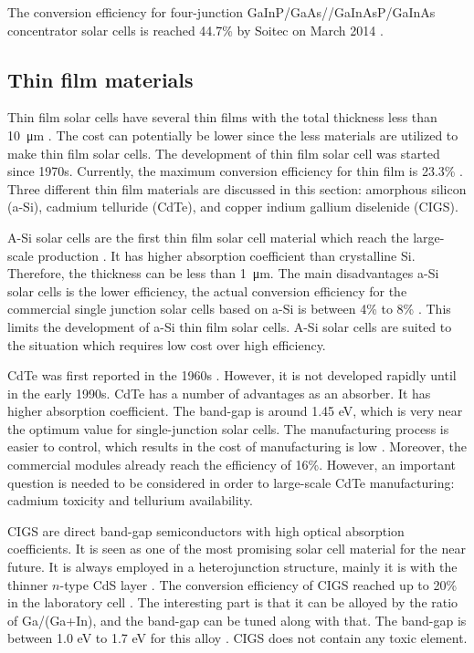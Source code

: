 \documentclass[a4paper, 12pt, titlepage,oneside,drop]{kthesis}
\begin{document}
The conversion efficiency for four-junction GaInP/GaAs//GaInAsP/GaInAs concentrator solar cells is reached 44.7\% by Soitec on March 2014 \cite{dimroth2014wafer}.

\subsection{Thin film materials}

Thin film solar cells have several thin films with the total thickness less than \SI{10} {\micro\meter} \cite{maissel1995handbook}. The cost can potentially be lower since the less materials are utilized to make thin film solar cells. The development of thin film
solar cell was started since 1970s. Currently, the maximum conversion efficiency for thin film is 23.3\% \cite{ward2014cu}. Three different thin film
materials are discussed in this section: amorphous silicon (a-Si), cadmium telluride (CdTe), and copper indium gallium diselenide (CIGS).

A-Si solar cells are the first thin film solar cell material which reach the large-scale production \cite{carlson1976amorphous, street2000technology, schropp1998amorphous}. It has higher absorption coefficient than crystalline Si. Therefore, the thickness can be less than \SI{1} {\micro\meter}. The 
main disadvantages a-Si solar cells is the lower efficiency, the actual conversion efficiency for the commercial single junction solar cells based on a-Si is between 4\% to 8\% \cite{irena}. This limits the development of a-Si thin film solar cells.
A-Si solar cells are suited to the situation which requires low cost over high efficiency. 

CdTe was first reported in the 1960s \cite{wolden2011photovoltaic}. However, it is not developed rapidly until in the early 1990s. CdTe has a number of advantages as an absorber. It has higher absorption coefficient. The band-gap is around 1.45 eV, which 
is very near the optimum value for single-junction solar cells. The manufacturing process is easier to control, which results in the cost of manufacturing is low \cite{meyers1988design}. Moreover, the commercial modules already reach the efficiency of 16\%.
However, an important question is needed to be considered in order to large-scale CdTe manufacturing: cadmium toxicity and tellurium availability. 

CIGS are direct band-gap semiconductors with high optical absorption coefficients. It is seen as one of the most promising solar cell material for the near future. It is always employed in a heterojunction structure, mainly it is with the thinner
$n$-type CdS layer \cite{green2007thin}. The conversion efficiency of CIGS reached up to 20\% in the laboratory cell \cite{jackson2011new}. The interesting part is that it can be alloyed by the ratio of Ga/(Ga+In), and the band-gap can be tuned along with that. The band-gap 
is between 1.0 eV to 1.7 eV for this alloy \cite{kumar2013cation, chen2012band, chen2011parameterization, persson2009impurity, green2006third}. CIGS does not contain any toxic element.
\end{document}
